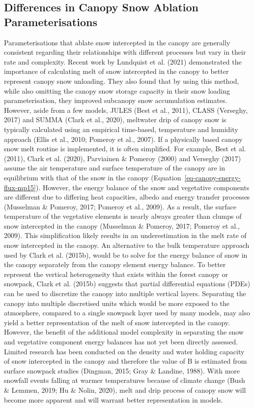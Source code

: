 \documentclass[
  letterpaper,
]{tex/uofsthesis-cs}
\begin{document}
\subsection{Differences in Canopy Snow Ablation
Parameterisations}\label{differences-in-canopy-snow-ablation-parameterisations}

Parameterisations that ablate snow intercepted in the canopy are
generally consistent regarding their relationships with different
processes but vary in their rate and complexity. Recent work by
Lundquist et al. (2021) demonstrated the importance of calculating melt
of snow intercepted in the canopy to better represent canopy snow
unloading. They also found that by using this method, while also
omitting the canopy snow storage capacity in their snow loading
parameterisation, they improved subcanopy snow accumulation estimates.
However, aside from a few models, JULES (Best et al., 2011), CLASS
(Verseghy, 2017) and SUMMA (Clark et al., 2020), meltwater drip of
canopy snow is typically calculated using an empirical time-based,
temperature and humidity approach (Ellis et al., 2010; Pomeroy et al.,
2007). If a physically based canopy snow melt routine is implemented, it
is often simplified. For example, Best et al. (2011), Clark et al.
(2020), Parviainen \& Pomeroy (2000) and Verseghy (2017) assume the air
temperature and surface temperature of the canopy are in equilibrium
with that of the snow in the canopy
(Equation~\ref{eq-canopy-energy-flux-mp15}). However, the energy balance
of the snow and vegetative components are different due to differing
heat capacities, albedo and energy transfer processes (Musselman \&
Pomeroy, 2017; Pomeroy et al., 2009). As a result, the surface
temperature of the vegetative elements is nearly always greater than
clumps of snow intercepted in the canopy (Musselman \& Pomeroy, 2017;
Pomeroy et al., 2009). This simplification likely results in an
underestimation in the melt rate of snow intercepted in the canopy. An
alternative to the bulk temperature approach used by Clark et al.
(2015b), would be to solve for the energy balance of snow in the canopy
separately from the canopy element energy balance. To better represent
the vertical heterogeneity that exists within the forest canopy or
snowpack, Clark et al. (2015b) suggests that partial differential
equations (PDEs) can be used to discretize the canopy into multiple
vertical layers. Separating the canopy into multiple discretised units
which would be more exposed to the atmosphere, compared to a single
snowpack layer used by many models, may also yield a better
representation of the melt of snow intercepted in the canopy. However,
the benefit of the additional model complexity in separating the snow
and vegetative component energy balances has not yet been directly
assessed. Limited research has been conducted on the density and water
holding capacity of snow intercepted in the canopy and therefore the
value of B is estimated from surface snowpack studies (Dingman, 2015;
Gray \& Landine, 1988). With more snowfall events falling at warmer
temperatures because of climate change (Bush \& Lemmen, 2019; Hu \&
Nolin, 2020), melt and drip process of canopy snow will become more
apparent and will warrant better representation in models.
\end{document}
